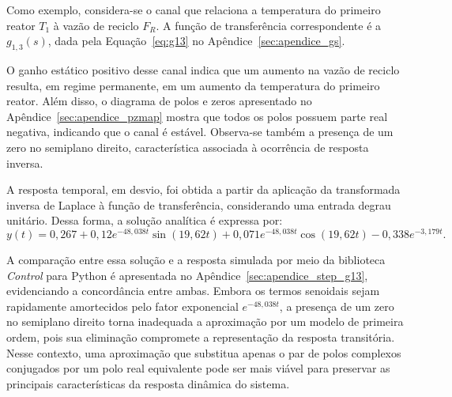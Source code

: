 Como exemplo, considera-se o canal que relaciona a temperatura do primeiro reator $T_1$ à vazão de reciclo $F_R$.
A função de transferência correspondente é a $g_{1,3}(s)$, dada pela Equação~\ref{eq:g13} no Apêndice~\ref{sec:apendice_gs}.

O ganho estático positivo desse canal indica que um aumento na vazão de reciclo resulta, em regime permanente, em um aumento da temperatura do primeiro reator. Além disso, o diagrama de polos e zeros apresentado no Apêndice~\ref{sec:apendice_pzmap} mostra que todos os polos possuem parte real negativa, indicando que o canal é estável. Observa-se também a presença de um zero no semiplano direito, característica associada à ocorrência de resposta inversa.

A resposta temporal, em desvio, foi obtida a partir da aplicação da transformada inversa de Laplace à função de transferência, considerando uma entrada degrau unitário. Dessa forma, a solução analítica é expressa por:
\begin{equation}
  y(t)=0{,}267 + 0{,}12 e^{- 48{,}038 t} \sin{\left(19{,}62 t \right)} + 0{,}071 e^{- 48{,}038 t} \cos{\left(19{,}62 t \right)} - 0{,}338 e^{- 3{,}179 t}.
  \label{eq:step_g13}
\end{equation}

A comparação entre essa solução e a resposta simulada por meio da biblioteca \textit{Control} para Python \cite{python-control2021} é apresentada no Apêndice~\ref{sec:apendice_step_g13}, evidenciando a concordância entre ambas. Embora os termos senoidais sejam rapidamente amortecidos pelo fator exponencial $e^{-48{,}038t}$, a presença de um zero no semiplano direito torna inadequada a aproximação por um modelo de primeira ordem, pois sua eliminação compromete a representação da resposta transitória. Nesse contexto, uma aproximação que substitua apenas o par de polos complexos conjugados por um polo real equivalente pode ser mais viável para preservar as principais características da resposta dinâmica do sistema.
